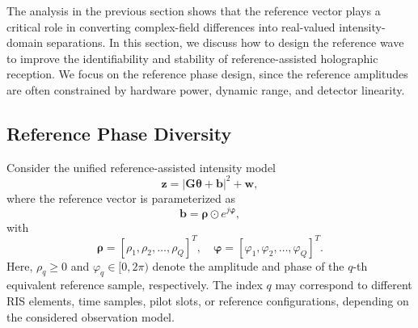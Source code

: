 \documentclass[journal]{IEEEtran}
\begin{document}
The analysis in the previous section shows that the reference vector plays a critical role in converting complex-field differences into real-valued intensity-domain separations. 
In this section, we discuss how to design the reference wave to improve the identifiability and stability of reference-assisted holographic reception. 
We focus on the reference phase design, since the reference amplitudes are often constrained by hardware power, dynamic range, and detector linearity.

\subsection{Reference Phase Diversity}

Consider the unified reference-assisted intensity model
\begin{equation}
\mathbf{z}
=
\left|
\mathbf{G}\boldsymbol{\theta}
+
\mathbf{b}
\right|^2
+
\mathbf{w},
\end{equation}
where the reference vector is parameterized as
\begin{equation}
\mathbf{b}
=
\boldsymbol{\rho}\odot e^{j\boldsymbol{\varphi}},
\label{eq:reference_phase_parameterization}
\end{equation}
with
\begin{equation}
\boldsymbol{\rho}
=
[\rho_1,\rho_2,\ldots,\rho_Q]^T,
\quad
\boldsymbol{\varphi}
=
[\varphi_1,\varphi_2,\ldots,\varphi_Q]^T.
\end{equation}
Here, $\rho_q\geq 0$ and $\varphi_q\in[0,2\pi)$ denote the amplitude and phase of the $q$-th equivalent reference sample, respectively. 
The index $q$ may correspond to different RIS elements, time samples, pilot slots, or reference configurations, depending on the considered observation model.
\end{document}
